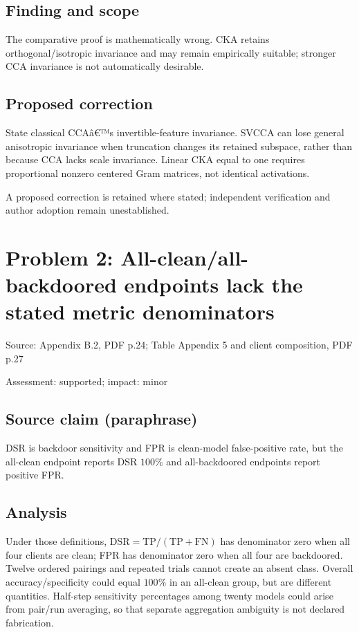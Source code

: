 \documentclass[11pt]{article}
\begin{document}
\subsection*{Finding and scope}

The comparative proof is mathematically wrong. CKA retains orthogonal/isotropic invariance and may remain empirically suitable; stronger CCA invariance is not automatically desirable.

\subsection*{Proposed correction}

State classical CCAâ€™s invertible-feature invariance. SVCCA can lose general anisotropic invariance when truncation changes its retained subspace, rather than because CCA lacks scale invariance. Linear CKA equal to one requires proportional nonzero centered Gram matrices, not identical activations.

A proposed correction is retained where stated; independent verification and author adoption remain unestablished.

\section*{Problem 2: All-clean/all-backdoored endpoints lack the stated metric denominators}

Source: Appendix B.2, PDF p.24; Table Appendix 5 and client composition, PDF p.27

Assessment: supported; impact: minor

\subsection*{Source claim (paraphrase)}

DSR is backdoor sensitivity and FPR is clean-model false-positive rate, but the all-clean endpoint reports DSR \(100\%\) and all-backdoored endpoints report positive FPR.

\subsection*{Analysis}

Under those definitions, \(\mathrm{DSR}=\mathrm{TP}/(\mathrm{TP}+\mathrm{FN})\) has denominator zero when all four clients are clean; FPR has denominator zero when all four are backdoored. Twelve ordered pairings and repeated trials cannot create an absent class. Overall accuracy/specificity could equal \(100\%\) in an all-clean group, but are different quantities. Half-step sensitivity percentages among twenty models could arise from pair/run averaging, so that separate aggregation ambiguity is not declared fabrication.
\end{document}
